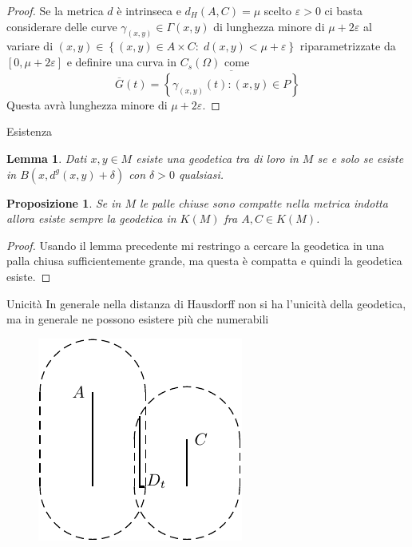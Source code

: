 \documentclass{beamer}
\newcounter{counter1}
\theoremstyle{plain}
\newtheorem{mylem}[counter1]{Lemma}
\newtheorem{mypro}[counter1]{Proposizione}
\theoremstyle{definition}
\theoremstyle{remark}
\newcommand{\obar}[1]{\overline{#1}}
\newcommand{\set}[1]{\left\{#1\right\}}
\newcommand{\bra}[1]{\left[#1\right]}
\begin{document}
\begin{frame}
  \begin{proof}
    Se la metrica $d$ è intrinseca e $d_H(A,C) = \mu$ scelto
    $\varepsilon >0$ ci basta considerare delle curve $\gamma _{(x,y)}
    \in \Gamma (x,y)$ di lunghezza minore di $\mu + 2\varepsilon$ al
    variare di $(x,y) \in \set{ (x,y) \in A\times C:\; d(x,y) < \mu +
      \varepsilon }$ riparametrizzate da $\bra{0, \mu + 2\varepsilon}$
    e definire una curva in $C_s(\Omega)$ come
    \[ \obar G(t) = \obar {\set{ \gamma_{(x,y)}(t) : (x,y) \in P }} \]
    Questa avrà lunghezza minore di $\mu + 2\varepsilon$.
  \end{proof}
\end{frame}

\begin{frame}{Esistenza}
  \begin{mylem}
    Dati $x,y \in M$ esiste una geodetica tra di loro in $M$ se e solo
    se esiste in $B(x,d^g(x,y) + \delta)$ con $\delta > 0$
    qualsiasi.
  \end{mylem}
  \begin{mypro}
    Se in $M$ le palle chiuse sono compatte nella metrica indotta
    allora esiste sempre la geodetica in $K(M)$ fra $A,C \in K(M)$.
  \end{mypro}
  \begin{proof}
    Usando il lemma precedente mi restringo a cercare la geodetica in
    una palla chiusa sufficientemente grande, ma questa è compatta e
    quindi la geodetica esiste.
  \end{proof}
\end{frame}
\begin{frame}{Unicità}
  In generale nella distanza di Hausdorff non si ha l'unicità della
  geodetica, ma in generale ne possono esistere più che numerabili
  \begin{figure}[h]
    \includegraphics[scale=1]{geodetichehausdorff.pdf}
  \end{figure}
\end{frame}
\end{document}
